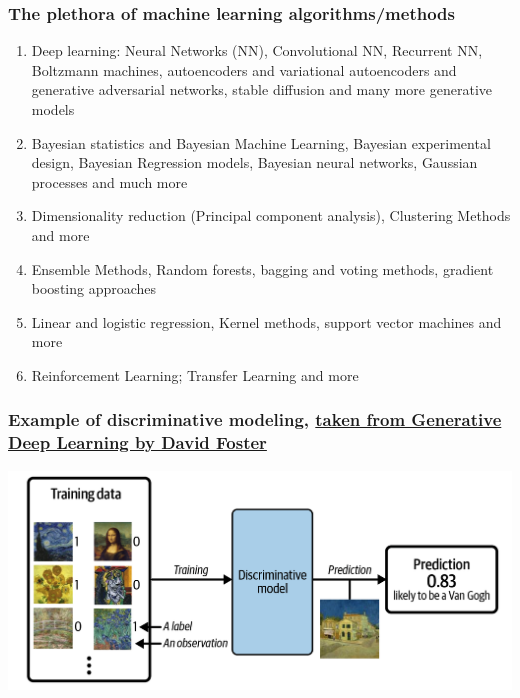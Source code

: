 \documentclass{beamer}
\begin{document}
\begin{frame}
\frametitle{The plethora  of machine learning algorithms/methods}

\begin{enumerate}
\item Deep learning: Neural Networks (NN), Convolutional NN, Recurrent NN, Boltzmann machines, autoencoders and variational autoencoders  and generative adversarial networks, stable diffusion and many more generative models

\item Bayesian statistics and Bayesian Machine Learning, Bayesian experimental design, Bayesian Regression models, Bayesian neural networks, Gaussian processes and much more

\item Dimensionality reduction (Principal component analysis), Clustering Methods and more

\item Ensemble Methods, Random forests, bagging and voting methods, gradient boosting approaches 

\item Linear and logistic regression, Kernel methods, support vector machines and more

\item Reinforcement Learning; Transfer Learning and more 
\end{enumerate}

\noindent
\end{frame}





\begin{frame}
\frametitle{Example of discriminative modeling, \href{{https://www.oreilly.com/library/view/generative-deep-learning/9781098134174/ch01.html}}{taken from Generative Deep Learning by David Foster}}

\vspace{6mm}

\centerline{\includegraphics[width=1.0\linewidth]{figures/standarddeeplearning.png}}

\vspace{6mm}
\end{frame}
\end{document}
